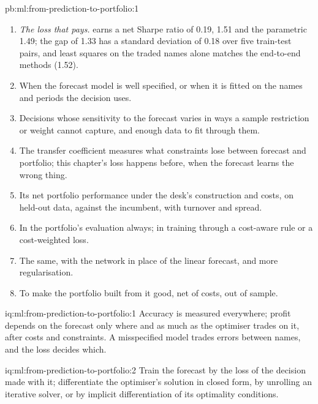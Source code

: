 \begin{solution}{pb:ml:from-prediction-to-portfolio:1}
\begin{enumerate}[resume]
\item \emph{The loss that pays.}  earns a net Sharpe ratio of 0.19,  1.51 and the
parametric  1.49; the gap of 1.33 has a standard deviation of 0.18 over five train-test pairs, and least squares on the
traded names alone matches the end-to-end methods (1.52).
\item When the forecast model is well specified, or when it is fitted on the names and periods the decision uses.
\item Decisions whose sensitivity to the forecast varies in ways a sample restriction or weight cannot capture, and enough data
to fit through them.
\item The transfer coefficient measures what constraints lose between forecast and portfolio; this chapter's loss happens
before, when the forecast learns the wrong thing.
\item Its net portfolio performance under the desk's construction and costs, on held-out data, against the incumbent, with
turnover and spread.
\item In the portfolio's evaluation always; in training through a cost-aware rule or a cost-weighted loss.
\item The same, with the network in place of the linear forecast, and more regularisation.
\item To make the portfolio built from it good, net of costs, out of sample.
\end{enumerate}
\end{solution}

\begin{solution}{iq:ml:from-prediction-to-portfolio:1}
Accuracy is measured everywhere; profit depends on the forecast only where and as much as the optimiser trades on it, after
costs and constraints. A misspecified model trades errors between names, and the loss decides which.
\end{solution}

\begin{solution}{iq:ml:from-prediction-to-portfolio:2}
Train the forecast by the loss of the decision made with it; differentiate the optimiser's solution in closed form, by
unrolling an iterative solver, or by implicit differentiation of its optimality conditions.
\end{solution}

